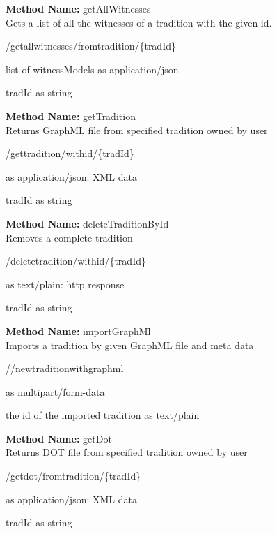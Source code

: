\textbf{Method Name: }getAllWitnesses \\ Gets a list of all the witnesses of a tradition with the given id.
\begin{get}
/getallwitnesses/fromtradition/\{tradId\}
\end{get}
\begin{response}
list of witnessModels as application/json
\end{response}
\begin{parameter}
tradId as string
\end{parameter}
\textbf{Method Name: }getTradition \\ Returns GraphML file from specified tradition owned by user
\begin{get}
/gettradition/withid/\{tradId\}
\end{get}
\begin{response}
 as application/json: XML data
\end{response}
\begin{parameter}
tradId as string
\end{parameter}
\textbf{Method Name: }deleteTraditionById \\ Removes a complete tradition
\begin{delete}
/deletetradition/withid/\{tradId\}
\end{delete}
\begin{response}
 as text/plain: http response
\end{response}
\begin{parameter}
tradId as string
\end{parameter}
\textbf{Method Name: }importGraphMl \\ Imports a tradition by given GraphML file and meta data
\begin{post}
//newtraditionwithgraphml
\end{post}
\begin{request}
 as multipart/form-data
\end{request}
\begin{response}
the id of the imported tradition as text/plain
\end{response}
\textbf{Method Name: }getDot \\ Returns DOT file from specified tradition owned by user
\begin{get}
/getdot/fromtradition/\{tradId\}
\end{get}
\begin{response}
 as application/json: XML data
\end{response}
\begin{parameter}
tradId as string
\end{parameter}
